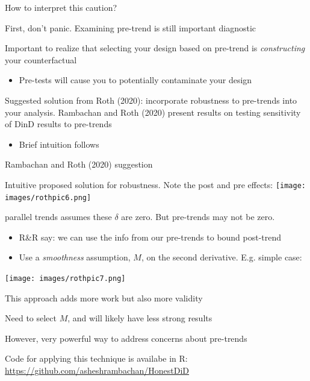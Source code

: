 \documentclass[notes,11pt, aspectratio=169]{beamer}
\newenvironment{wideitemize}{\itemize\addtolength{\itemsep}{10pt}}{\enditemize}
\begin{document}
\begin{frame}{How to interpret this caution?}
  \begin{wideitemize}
  \item First, don't panic. Examining pre-trend is still important
    diagnostic
  \item Important to realize that selecting your design based on
    pre-trend is \emph{constructing} your counterfactual
    \begin{itemize}
    \item Pre-tests will cause you to potentially contaminate your
      design
    \end{itemize}
  \item Suggested solution from Roth (2020): incorporate robustness to
    pre-trends into your analysis. Rambachan and Roth (2020) present
    results on testing sensitivity of DinD results to pre-trends
    \begin{itemize}
    \item Brief intuition follows
    \end{itemize}
  \end{wideitemize}
\end{frame}


\begin{frame}{Rambachan and Roth (2020) suggestion}
  \begin{wideitemize}
  \item Intuitive proposed solution for robustness. Note the post and pre effects:
    \texttt{[image: images/rothpic6.png]}
    \vspace{-10pt}
  \item parallel trends assumes these $\delta$ are zero. But pre-trends may not be zero. 
    \begin{itemize}
    \item R\&R say: we can use the info from our pre-trends to bound
      post-trend
    \item Use a \emph{smoothness} assumption, $M$, on the second derivative. E.g. simple case:
    \end{itemize}
    \texttt{[image: images/rothpic7.png]}    
  \end{wideitemize}
\end{frame}

\begin{frame}{This approach adds more work but also more validity}
  \begin{wideitemize}
  \item  Need to select $M$, and will likely have less strong results
  \item However, very powerful way to address concerns about pre-trends
  \item Code for applying this technique is availabe in R:
    \url{https://github.com/asheshrambachan/HonestDiD}
  \end{wideitemize}
\end{frame}
\end{document}
